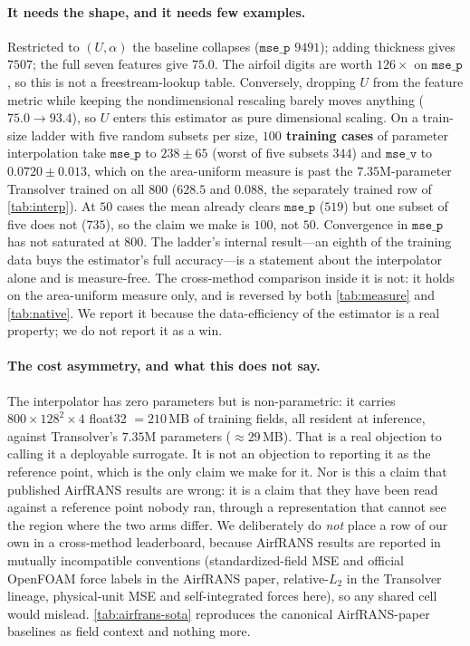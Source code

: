 \paragraph{It needs the shape, and it needs few examples.} Restricted to $(U,\alpha)$
the baseline collapses ($\texttt{mse\_p}$ $9491$); adding thickness gives $7507$; the
full seven features give $75.0$. The airfoil digits are worth $126\times$ on
$\texttt{mse\_p}$, so this is not a freestream-lookup table. Conversely, dropping $U$
from the feature metric while keeping the nondimensional rescaling barely moves anything
($75.0\to93.4$), so $U$ enters this estimator as pure dimensional scaling. On a train-size
ladder with five random subsets per size,
\textbf{$100$ training cases} of parameter interpolation take $\texttt{mse\_p}$ to
$238{\pm}65$ (worst of five subsets $344$) and $\texttt{mse\_v}$ to $0.0720{\pm}0.013$,
which on the area-uniform measure is past the $7.35$M-parameter Transolver trained on all
$800$ ($628.5$ and $0.088$, the separately trained row of \autoref{tab:interp}). At $50$ cases the mean already clears $\texttt{mse\_p}$
($519$) but one subset of five does not ($735$), so the claim we make is $100$, not $50$.
Convergence in $\texttt{mse\_p}$ has not saturated at $800$. The ladder's internal
result---an eighth of the training data buys the estimator's full accuracy---is a
statement about the interpolator alone and is measure-free. The cross-method comparison
inside it is not: it holds on the area-uniform measure only, and is reversed by both
\autoref{tab:measure} and \autoref{tab:native}. We report it because the data-efficiency
of the estimator is a real property; we do not report it as a win.

\paragraph{The cost asymmetry, and what this does not say.} The interpolator has zero
parameters but is non-parametric: it carries $800\times128^2\times4$ float32
$=210$\,MB of training fields, all resident at inference, against Transolver's
$7.35$M parameters ($\approx29$\,MB). That is a real objection to calling it a
deployable surrogate. It is not an objection to reporting it as the reference point, which
is the only claim we make for it. Nor is this a claim that published AirfRANS results are
wrong: it is a claim that they have been read against a reference point nobody ran,
through a representation that cannot see the region where the two arms differ. We
deliberately do \emph{not} place a row of our own in a cross-method leaderboard, because
AirfRANS results are reported in mutually incompatible conventions (standardized-field MSE
and official OpenFOAM force labels in the AirfRANS paper, relative-$L_2$ in the Transolver
lineage, physical-unit MSE and self-integrated forces here), so any shared cell would
mislead. \autoref{tab:airfrans-sota} reproduces the canonical AirfRANS-paper baselines as
field context and nothing more.


